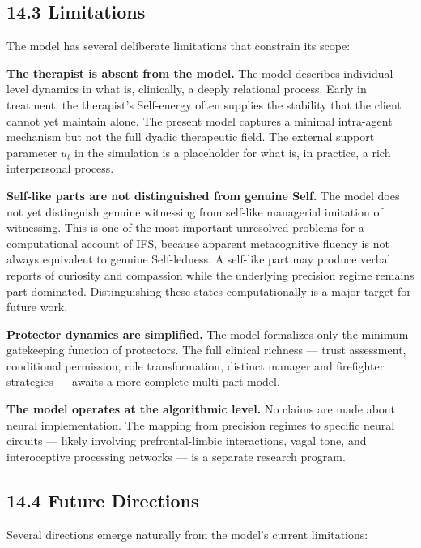 \documentclass[11pt]{article}
\begin{document}
\subsection{14.3 Limitations}\label{limitations}

The model has several deliberate limitations that constrain its scope:

\textbf{The therapist is absent from the model.} The model describes
individual-level dynamics in what is, clinically, a deeply relational
process. Early in treatment, the therapist's Self-energy often supplies
the stability that the client cannot yet maintain alone. The present
model captures a minimal intra-agent mechanism but not the full dyadic
therapeutic field. The external support parameter \(u_t\) in the
simulation is a placeholder for what is, in practice, a rich
interpersonal process.

\textbf{Self-like parts are not distinguished from genuine Self.} The
model does not yet distinguish genuine witnessing from self-like
managerial imitation of witnessing. This is one of the most important
unresolved problems for a computational account of IFS, because apparent
metacognitive fluency is not always equivalent to genuine Self-ledness.
A self-like part may produce verbal reports of curiosity and compassion
while the underlying precision regime remains part-dominated.
Distinguishing these states computationally is a major target for future
work.

\textbf{Protector dynamics are simplified.} The model formalizes only
the minimum gatekeeping function of protectors. The full clinical
richness --- trust assessment, conditional permission, role
transformation, distinct manager and firefighter strategies --- awaits a
more complete multi-part model.

\textbf{The model operates at the algorithmic level.} No claims are made
about neural implementation. The mapping from precision regimes to
specific neural circuits --- likely involving prefrontal-limbic
interactions, vagal tone, and interoceptive processing networks --- is a
separate research program.

\subsection{14.4 Future Directions}\label{future-directions}

Several directions emerge naturally from the model's current
limitations:
\end{document}
